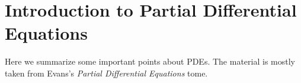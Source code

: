 \chapter{Introduction to Partial Differential Equations}
Here we summarize some important points about PDEs. The material is mostly
taken from Evans's \emph{Partial Differential Equations} tome.


